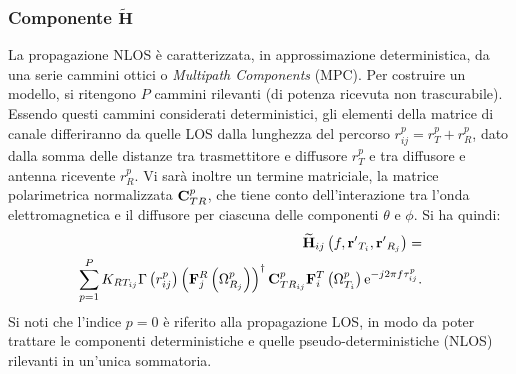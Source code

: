 \documentclass[technote]{IEEEtran}
\newcommand{\mat}[1]{\mathbf{#1}}
\begin{document}

\subsubsection*{Componente $ \widetilde{\mat{H}}$ }
La propagazione NLOS è caratterizzata, in approssimazione deterministica, da una serie cammini ottici o \textit{Multipath Components} (MPC). Per costruire un modello, si ritengono $P$ cammini rilevanti (di potenza ricevuta non trascurabile). Essendo questi cammini considerati deterministici, gli elementi della matrice di canale differiranno da quelle LOS dalla lunghezza del percorso $r_{ij}^p = r_T^p + r_R^p$, dato dalla somma delle distanze tra trasmettitore e diffusore $r_T^p$ e tra diffusore e antenna ricevente $r_R^p$. Vi sarà  inoltre un termine matriciale, la matrice polarimetrica normalizzata ${\bf{C}}_{TR}^p$, che tiene conto dell'interazione tra l'onda elettromagnetica e il diffusore per ciascuna delle componenti $\theta$ e $\phi $. Si ha quindi:
\begin{eqnarray} 
& & \hspace{0cm} {\widetilde {\bf{H}}_{ij}}\left( f, {{{{\bf{r'}}}_{{T_i}}},{{{\bf{r'}}}_{{R_j}}}} \right) = \nonumber \\
& & \hspace{-.8cm} \sum\limits_{p = 1}^P {{K_{R{T_{ij}}}}\Gamma \left( {r_{ij}^p} \right){{\left( {{\bf{F}}_j^R\left( {\Omega _{{R_j}}^p} \right)} \right)}^\dagger}\,{\bf{C}}_{T{R_{ij}}}^p{\bf{F}}_i^T\left( {\Omega _{{T_i}}^p} \right){{\rm{e}}^{ - j2\pi f\tau _{ij}^p}}}. \nonumber
\end{eqnarray}
Si noti che l'indice $p = 0$ è riferito alla propagazione LOS, in modo da poter trattare le componenti deterministiche e quelle pseudo-deterministiche (NLOS) rilevanti in un'unica sommatoria. 
\end{document}

